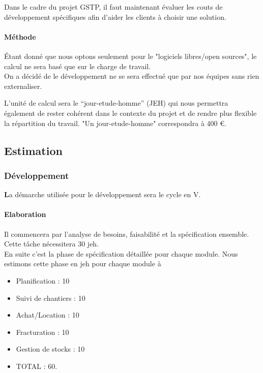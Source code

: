         Dans le cadre du projet GSTP, il faut maintenant évaluer les couts de développement spécifiques afin d'aider les clients à choisir une solution.

        \paragraph{Méthode}

        Étant donné que nous optons seulement pour le "logiciels libres/open sources", le calcul ne sera basé que sur le charge de travail.\\

        On a décidé de le développement ne se sera effectué que par nos équipes sans rien externaliser.

        L’unité de calcul sera le ``jour-etude-homme'' (JEH) qui nous permettra également de rester cohérent dans le contexte du projet et de rendre plus flexible la répartition du travail. "Un jour-etude-homme" correspondra à 400 €.

    \subsection{Estimation}

    \subsubsection{Développement}\textbf
    La démarche utilisée pour le développement sera le cycle en V. 

        \paragraph{Elaboration}
        Il commencera par l'analyse de besoins, faisabilité et la spécification ensemble. Cette tâche nécessitera  30 jeh. \\

    En suite c'est la phase de spécification détaillée pour chaque module. Nous estimons cette phase en jeh pour chaque module à
    \begin{itemize}
         \item Planification : 10
         \item Suivi de chantiers : 10 
         \item Achat/Location : 10 
         \item Fracturation : 10
         \item Gestion de stocks : 10 
         \item TOTAL : 60.
    \end{itemize}
    
